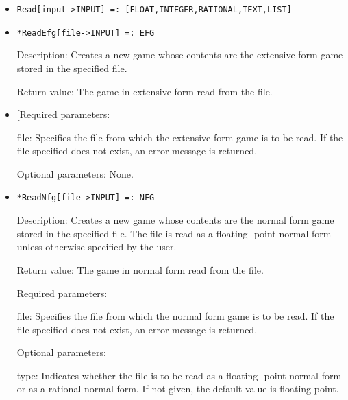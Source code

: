 \begin{itemize}
\item
\protect \large \begin{verbatim}
Read[input->INPUT] =: [FLOAT,INTEGER,RATIONAL,TEXT,LIST]
\end{verbatim}\normalsize

\item
\protect \large \begin{verbatim}
*ReadEfg[file->INPUT] =: EFG
\end{verbatim}\normalsize

\bd
\item
[Description:] Creates a new game whose contents are the extensive
form game stored in the specified file.
\item
[Return value:] The game in extensive form read from the file.
\item

[Required parameters:

\bd
\item
[file:] Specifies the file from which the extensive form game is to be
read.  If the file specified does not exist, an error message is
returned.
\ed

\item
[Optional parameters:] None.
\ed

\item
\protect \large \begin{verbatim}
*ReadNfg[file->INPUT] =: NFG
\end{verbatim}\normalsize
\bd
\item
[Description:] Creates a new game whose contents are the normal
form game stored in the specified file.  The file is read as a
floating- point normal form unless otherwise specified by the user.
\item
[Return value:] The game in normal form read from the file.
\item
[Required parameters:]\hfil\null

\bd
\item
[file:] Specifies the file from which the normal form game is to be
read.  If the file specified does not exist, an error message is
returned.
\ed

\item
[Optional parameters:]\hfil\null
	

\bd
\item
[type:] Indicates whether the file is to be read as a floating- point
normal form or as a rational normal form.  If not given, the default
value is floating-point.
\ed
\ed


\end{itemize}
